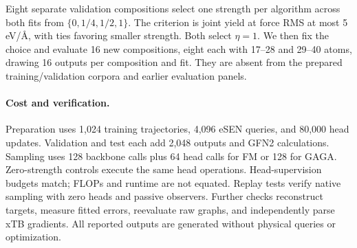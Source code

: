 Eight separate validation compositions select one strength per algorithm across both fits from $\{0,1/4,1/2,1\}$. The criterion is joint yield at force RMS at most 5 eV/\AA, with ties favoring smaller strength. Both select $\eta=1$. We then fix the choice and evaluate 16 new compositions, eight each with 17--28 and 29--40 atoms, drawing 16 outputs per composition and fit. They are absent from the prepared training/validation corpora and earlier evaluation panels.



\paragraph{Cost and verification.}
Preparation uses 1,024 training trajectories, 4,096 eSEN queries, and 80,000 head updates. Validation and test each add 2,048 outputs and GFN2 calculations. Sampling uses 128 backbone calls plus 64 head calls for FM or 128 for GAGA. Zero-strength controls execute the same head operations. Head-supervision budgets match; FLOPs and runtime are not equated. Replay tests verify native sampling with zero heads and passive observers. Further checks reconstruct targets, measure fitted errors, reevaluate raw graphs, and independently parse xTB gradients. All reported outputs are generated without physical queries or optimization.


